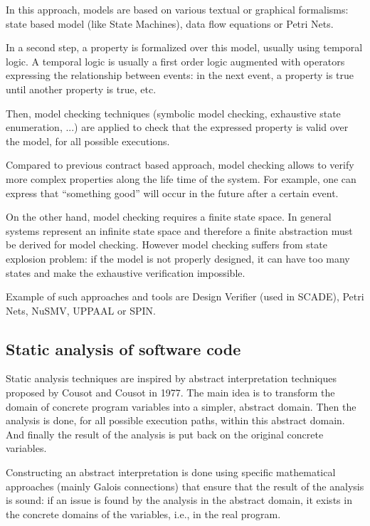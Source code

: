 In this approach, models are based on various textual or graphical
formalisms: state based model (like State Machines), data flow equations
or Petri Nets.

In a second step, a property is formalized over this model, usually
using temporal logic. A temporal logic is usually a first order logic
augmented with operators expressing the relationship between events:
in the next event, a property is true until another property is true,
etc.

Then, model checking techniques (symbolic model checking, exhaustive
state enumeration, ...) are applied to check that the expressed
property is valid over the model, for all possible executions.

Compared to previous contract based approach, model checking allows to
verify more complex properties along the life time of the system. For
example, one can express that ``something good'' will occur in the
future after a certain event.

On the other hand, model checking requires a finite state space. In
general systems represent an infinite state space and therefore a finite
abstraction must be derived for model checking. However model checking
suffers from state explosion problem: if the model is not properly
designed, it can have too many states and make the exhaustive
verification impossible.

Example of such approaches and tools are Design Verifier (used in
SCADE), Petri Nets, NuSMV, UPPAAL or SPIN.

\subsection{Static analysis of software code}

Static analysis techniques are inspired by abstract interpretation
techniques proposed by Cousot and Cousot in 1977. The main idea is to
transform the domain of concrete program variables into a simpler,
abstract domain. Then the analysis is done, for all possible execution
paths, within this abstract domain. And finally the result of the
analysis is put back on the original concrete variables.

Constructing an abstract interpretation is done using specific
mathematical approaches (mainly Galois connections) that ensure that
the result of the analysis is sound: if an issue is found by the
analysis in the abstract domain, it exists in the concrete domains of
the variables, i.e., in the real program.

